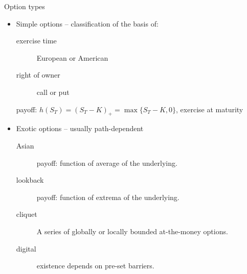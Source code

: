\documentclass[utf8,t,xcolor=svgnames]{beamer}
\begin{document}
\begin{frame}{Option types}
	\begin{itemize}
		\item Simple options -- classification of the basis of:
		\begin{description}
			\item[exercise time] European or American
			\item[right of owner] call or put
		\end{description}
		\begin{example}
			payoff: $ h(S_T) = (S_T - K)_+ = \max \{S_T - K, 0\} $, exercise at maturity
		\end{example}
		\item Exotic options -- usually path-dependent
		\begin{description}
			\item[\alert{Asian}] payoff: function of average of the underlying.
			\item[lookback] payoff: function of extrema of the underlying.
			\item[\alert{cliquet}] A series of globally or locally bounded at-the-money options.
			\item[digital] existence depends on pre-set barriers.
		\end{description}
	\end{itemize}
\end{frame}
\end{document}
